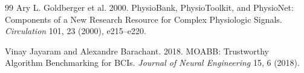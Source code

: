 \documentclass[10pt,twocolumn]{article}
\begin{document}
\begin{thebibliography}{99}
Ary L. Goldberger et al. 2000. PhysioBank, PhysioToolkit, and PhysioNet: Components of a New Research Resource for Complex Physiologic Signals. \emph{Circulation} 101, 23 (2000), e215--e220.

Vinay Jayaram and Alexandre Barachant. 2018. MOABB: Trustworthy Algorithm Benchmarking for BCIs. \emph{Journal of Neural Engineering} 15, 6 (2018).

\end{thebibliography}
\end{document}
